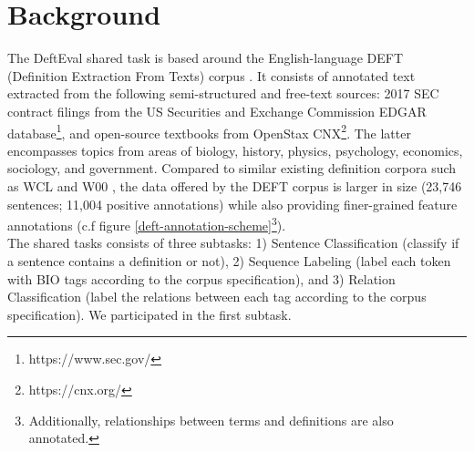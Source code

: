 \documentclass[11pt]{article}
\begin{document}
\section{Background}
The DeftEval shared task is based around the English-language DEFT (Definition Extraction From Texts) corpus \cite{spala-etal-2019-deft}.
It consists of annotated text extracted from the following semi-structured and free-text sources: 2017 SEC contract filings from the US Securities and
Exchange Commission EDGAR database\footnote{https://www.sec.gov/}, and open-source textbooks from OpenStax CNX\footnote{https://cnx.org/}. The
latter encompasses topics from areas of biology, history, physics, psychology, economics, sociology, and government.
Compared to similar existing definition corpora such as WCL \cite{navigli2010learning} and W00 \cite{jin2013mining}, the data offered by the DEFT corpus is
larger in size (23,746 sentences; 11,004 positive annotations) while also providing finer-grained feature annotations
(c.f figure \ref{deft-annotation-scheme}\footnote{Additionally, relationships between terms and definitions are also annotated.}).\\

The shared tasks consists of three subtasks: 1) Sentence Classification (classify if a sentence contains a definition or not),
2) Sequence Labeling (label each token with BIO tags according to the corpus specification), and 3) Relation Classification
(label the relations between each tag according to the corpus specification). We participated in the first subtask.\\
\end{document}
